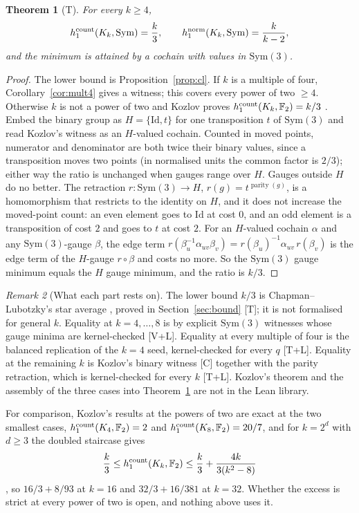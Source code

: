 \documentclass[11pt]{article}
\newtheorem{theorem}{Theorem}\newtheorem{proposition}[theorem]{Proposition}\newtheorem{corollary}[theorem]{Corollary}
\theoremstyle{remark}\newtheorem{remark}[theorem]{Remark}
\newcommand{\Sym}{\mathrm{Sym}}\newcommand{\dH}{d_H}\newcommand{\F}{\mathbb{F}}\newcommand{\Z}{\mathbb{Z}}
\newcommand{\Id}{\mathrm{Id}}\newcommand{\Tr}{\operatorname{Tr}}
\begin{document}
\begin{theorem}[T]\label{thm:all}
For every $k\ge4$,
\[
h_1^{\rm count}(K_k,\Sym)=\frac k3,\qquad h_1^{\rm norm}(K_k,\Sym)=\frac{k}{k-2},
\]
and the minimum is attained by a cochain with values in $\Sym(3)$.
\end{theorem}
\begin{proof}
The lower bound is Proposition~\ref{prop:cl}. If $k$ is a multiple of four, Corollary~\ref{cor:mult4} gives a witness; this covers every power of two $\ge4$. Otherwise $k$ is not a power of two and Kozlov proves $h_1^{\rm count}(K_k,\F_2)=k/3$ \cite[Thm.~4.2, Cor.~4.3]{Koz}. Embed the binary group as $H=\{\Id,t\}$ for one transposition $t$ of $\Sym(3)$ and read Kozlov's witness as an $H$-valued cochain. Counted in moved points, numerator and denominator are both twice their binary values, since a transposition moves two points (in normalised units the common factor is $2/3$); either way the ratio is unchanged when gauges range over $H$. Gauges outside $H$ do no better. The retraction $r:\Sym(3)\to H$, $r(g)=t^{\operatorname{parity}(g)}$, is a homomorphism that restricts to the identity on $H$, and it does not increase the moved-point count: an even element goes to $\Id$ at cost $0$, and an odd element is a transposition of cost $2$ and goes to $t$ at cost $2$. For an $H$-valued cochain $\alpha$ and any $\Sym(3)$-gauge $\beta$, the edge term $r(\beta_u^{-1}\alpha_{uv}\beta_v)=r(\beta_u)^{-1}\alpha_{uv}\,r(\beta_v)$ is the edge term of the $H$-gauge $r\circ\beta$ and costs no more. So the $\Sym(3)$ gauge minimum equals the $H$ gauge minimum, and the ratio is $k/3$.
\end{proof}
\begin{remark}[What each part rests on]
The lower bound $k/3$ is Chapman--Lubotzky's star average \cite[Prop.~3.2]{CL2}, proved in Section~\ref{sec:bound} [T]; it is not formalised for general $k$. Equality at $k=4,\dots,8$ is by explicit $\Sym(3)$ witnesses whose gauge minima are kernel-checked [V+L]. Equality at every multiple of four is the balanced replication of the $k=4$ seed, kernel-checked for every $q$ [T+L]. Equality at the remaining $k$ is Kozlov's binary witness [C] together with the parity retraction, which is kernel-checked for every $k$ [T+L]. Kozlov's theorem and the assembly of the three cases into Theorem~\ref{thm:all} are not in the Lean library.
\end{remark}
For comparison, Kozlov's results at the powers of two are exact at the two smallest cases, $h_1^{\rm count}(K_4,\F_2)=2$ and $h_1^{\rm count}(K_8,\F_2)=20/7$, and for $k=2^d$ with $d\ge3$ the doubled staircase gives
\[
\frac k3\le h_1^{\rm count}(K_k,\F_2)\le\frac k3+\frac{4k}{3(k^2-8)}
\]
\cite[Thm.~4.6]{Koz}, so $16/3+8/93$ at $k=16$ and $32/3+16/381$ at $k=32$. Whether the excess is strict at every power of two is open, and nothing above uses it.
\end{document}
